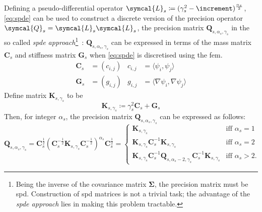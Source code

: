 \documentclass[british]{scrreprt}
\renewcommand{\laplacian}{\increment}
\begin{document}
Defining a pseudo-differential operator \( \symcal{L}_{s} \coloneqq (\gamma_{s}^{2} - \laplacian)^{\frac{\alpha_{s}}{2}} \), \cref{eq:spde} can be used to construct a discrete version of the precision operator \( \symcal{Q}_{s} = \symcal{L}_{s} \symcal{L}_{s} \), the precision matrix \( \symbf{Q}_{s, \alpha_{s}, \gamma_{s}} \) in the so called \textit{\gls{spde} approach}\footnote{Being the inverse of the covariance matrix \( \symbf{\Sigma} \), the precision matrix must be \gls{spd}. Construction of \gls{spd} matrices is not a trivial task; the advantage of the \textit{\gls{spde} approach} lies in making this problem tractable.}~\cite{LindgrenexplicitlinkGaussian2011}: \( \symbf{Q}_{s, \alpha_{s}, \gamma_{s}} \) can be expressed in terms of the mass matrix \( \symbf{C}_{s} \) and stiffness matrix \( \symbf{G}_{s} \) when \cref{eq:spde} is discretised using the \gls{fem}.
\begin{align}
    \symbf{C}_{s} &= (c_{i, j}) & c_{i, j} &= \langle        \psi_{i},        \psi_{j} \rangle \label{eq:consistent-mass-matrix} \\
    \symbf{G}_{s} &= (g_{i, j}) & g_{i, j} &= \langle \nabla \psi_{i}, \nabla \psi_{j} \rangle \label{eq:stiffness-matrix}
\end{align}
Define matrix \( \symbf{K}_{s, \gamma_{s}} \) to be
\begin{equation}
    \symbf{K}_{s, \gamma_{s}} \coloneqq \gamma_{s}^{2} \symbf{C}_{s} + \symbf{G}_{s} \label{eq:K}
\end{equation}
Then, for integer \( \alpha_{s} \), the precision matrix \( \symbf{Q}_{s, \alpha_{s}, \gamma_{s}} \) can be expressed as follows:
\begin{equation}
    \symbf{Q}_{s, \alpha_{s}, \gamma_{s}} = \symbf{C}_{s}^{\frac{1}{2}} \left( \symbf{C}_{s}^{-\frac{1}{2}} \symbf{K}_{s, \gamma_{s}} \symbf{C}_{s}^{-\frac{1}{2}} \right)^{\alpha_{s}} \symbf{C}_{s}^{\frac{1}{2}} = \begin{cases}
        \symbf{K}_{s, \gamma_{s}}
            & \text{iff } \alpha_{s} = 1 \\
        \symbf{K}_{s, \gamma_{s}} \symbf{C}_{s}^{-1} \symbf{K}_{s, \gamma_{s}}
            & \text{iff } \alpha_{s} = 2 \\
        \symbf{K}_{s, \gamma_{s}} \symbf{C}_{s}^{-1} \symbf{Q}_{s, \alpha_{s} - 2, \gamma_{s}} \symbf{C}_{s}^{-1} \symbf{K}_{s, \gamma_{s}}
            & \text{iff } \alpha_{s} > 2
            \text{.}
    \end{cases}
    \label{eq:consistent-precision-matrix}
\end{equation}
\end{document}
